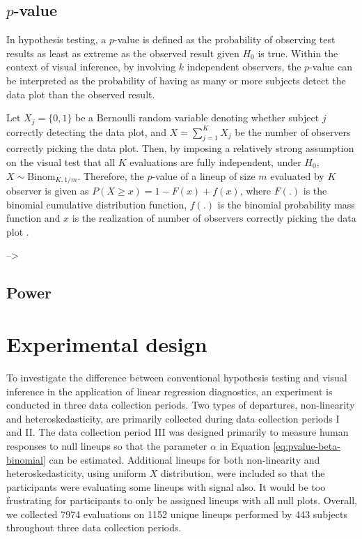 \documentclass[]{interact}
\theoremstyle{plain}%
\theoremstyle{definition}
\theoremstyle{remark}
\begin{document}
\hypertarget{p-value}{%
\subsection{\texorpdfstring{\(p\)-value}{p-value}}\label{p-value}}

In hypothesis testing, a \(p\)-value is defined as the probability of
observing test results as least as extreme as the observed result given
\(H_0\) is true. Within the context of visual inference, by involving
\(k\) independent observers, the \(p\)-value can be interpreted as the
probability of having as many or more subjects detect the data plot than
the observed result.

Let \(X_j = \{0,1\}\) be a Bernoulli random variable denoting whether
subject \(j\) correctly detecting the data plot, and
\(X = \sum_{j=1}^{K}X_j\) be the number of observers correctly picking
the data plot. Then, by imposing a relatively strong assumption on the
visual test that all \(K\) evaluations are fully independent, under
\(H_0\), \(X \sim \mathrm{Binom}_{K,1/m}\). Therefore, the \(p\)-value
of a lineup of size \(m\) evaluated by \(K\) observer is given as
\(P(X \geq x) = 1 - F(x) + f(x)\), where \(F(.)\) is the binomial
cumulative distribution function, \(f(.)\) is the binomial probability
mass function and \(x\) is the realization of number of observers
correctly picking the data plot \citep{majumder_validation_2013}.

--\textgreater{}

\hypertarget{power}{%
\subsection{Power}\label{power}}

\hypertarget{experimental-design}{%
\section{Experimental design}\label{experimental-design}}

To investigate the difference between conventional hypothesis testing
and visual inference in the application of linear regression
diagnostics, an experiment is conducted in three data collection
periods. Two types of departures, non-linearity and heteroskedasticity,
are primarily collected during data collection periods I and II. The
data collection period III was designed primarily to measure human
responses to null lineups so that the parameter \(\alpha\) in Equation
\ref{eq:pvalue-beta-binomial} can be estimated. Additional lineups for
both non-linearity and heteroskedasticity, using uniform \(X\)
distribution, were included so that the participants were evaluating
some lineups with signal also. It would be too frustrating for
participants to only be assigned lineups with all null plots. Overall,
we collected 7974 evaluations on 1152 unique lineups performed by 443
subjects throughout three data collection periods.
\end{document}
